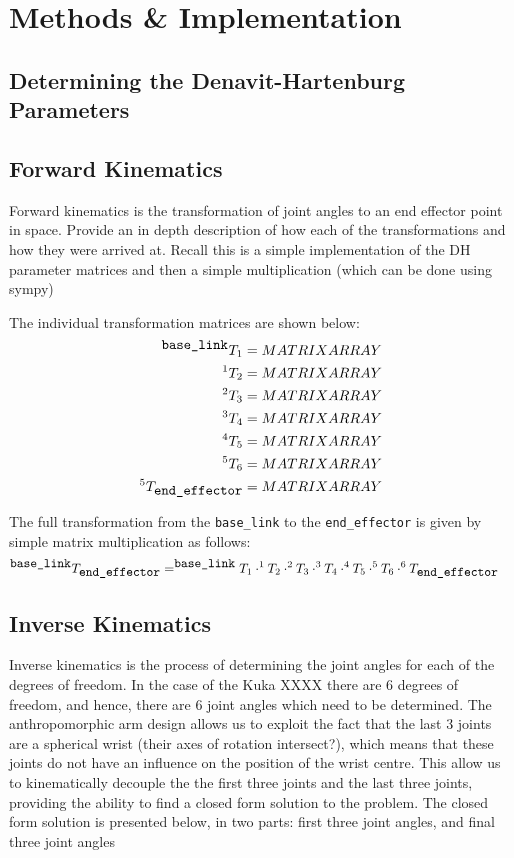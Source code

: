 \documentclass[a4paper]{article}
\begin{document}
\section{Methods \& Implementation}

\subsection{Determining the Denavit-Hartenburg Parameters}

\subsection{Forward Kinematics}
Forward kinematics is the transformation of joint angles to an end effector point in space. Provide an in depth description of how each of the transformations and how they were arrived at. Recall this is a simple implementation of the DH parameter matrices and then a simple multiplication (which can be done using sympy)

The individual transformation matrices are shown below:
\begin{align}
	^{\verb|base_link|} T _1 &= MATRIX ARRAY\\
	^1 T _2 &= MATRIX ARRAY\\
	^2 T _3 &= MATRIX ARRAY\\
	^3 T _4 &= MATRIX ARRAY\\
	^4 T _5 &= MATRIX ARRAY\\
	^5 T _6 &= MATRIX ARRAY\\
	^5 T _{\verb|end_effector|} &= MATRIX ARRAY
	 
\end{align}

The full transformation from the \verb|base_link| to the \verb|end_effector| is given by simple matrix multiplication as follows:
\begin{align}
	^{\verb|base_link|} T_{\verb|end_effector|} &= ^{\verb|base_link|} T_{1} \cdot ^{1} T_{2} \cdot ^{2} T_{3} \cdot ^{3} T_{4} \cdot ^{4} T_{5} \cdot ^{5} T_{6} \cdot ^{6} T_{\verb|end_effector|}
\end{align}

\subsection{Inverse Kinematics}
Inverse kinematics is the process of determining the joint angles for each of the degrees of freedom. In the case of the Kuka XXXX there are 6 degrees of freedom, and hence, there are 6 joint angles which need to be determined. The anthropomorphic arm design allows us to exploit the fact that the last 3 joints are a spherical wrist (their axes of rotation intersect?), which means that these joints do not have an influence on the position of the wrist centre. This allow us to kinematically decouple the the first three joints and the last three joints, providing the ability to find a closed form solution to the problem. The closed form solution is presented below, in two parts: first three joint angles, and final three joint angles
\end{document}
